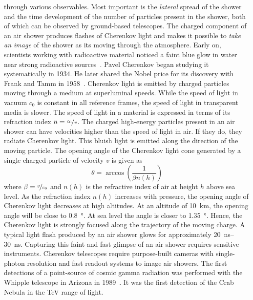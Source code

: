 through various observables. Most important is the \emph{lateral} spread of the shower and the 
time development of the number of particles present in the shower, both of which can be observed by ground-based telescopes.
The charged component of an air shower produces flashes of Cherenkov light and makes it possible to \emph{take an image}
of the shower as its moving through the atmosphere. 
Early on, scientists working with radioactive material noticed a faint blue glow in water near strong radioactive sources~\cite[835]{grieder_air_shower}. 
Pavel Cherenkov began studying it systematically in 1934. He later shared the Nobel price for its discovery with Frank and Tamm in 1958~\cite{nobel_1958}. 
Cherenkov light is emitted by charged particles moving through a medium at superluminal speeds. 
While the speed of light in vacuum $c_0$ is constant in all reference frames, the speed of light in 
transparent media is slower. The speed of light in a material is expressed in terms of its 
refraction index $n=\nicefrac{c_0}{v}$. The charged high-energy particles present in an air shower can 
have velocities higher than the speed of light in air. If they do, they radiate Cherenkov light.
This bluish light is emitted along the direction of the moving particle.
The opening angle of the Cherenkov light cone generated by a single charged particle of velocity $v$ is given as 
\begin{equation}
  \label{eq:opening_angle}
  \theta = \arccos\left(\frac{1}{\beta n(h)}\right)
\end{equation}
where $\beta = \nicefrac{v}{c_0}$ and $n(h)$ is the refractive index of air at height  $h$ above sea level.
As the refraction index $n(h)$ increases with pressure, the opening angle of Cherenkov light decreases at high altitudes. 
At an altitude of \SI{10}{\kilo\metre}, the opening angle will be close to \SI{0.8}{\degree}. At sea level the angle is closer to \SI{1.35}{\degree}.
Hence, the Cherenkov light is strongly focused along the trajectory of the moving charge. 
A typical light flash produced by an air shower glows for approximately \SIrange{20}{30}{\nano\second}.
Capturing this faint and fast glimpse of an air shower requires sensitive instruments.
Cherenkov telescopes require purpose-built cameras with single-photon resolution and fast readout systems to 
image air showers.   
The first detections of a point-source of cosmic gamma radiation was performed with the Whipple telescope in Arizona in 1989~\cite{whipple_crab}.
It was the first detection of the Crab Nebula in the \si{TeV} range of light.
